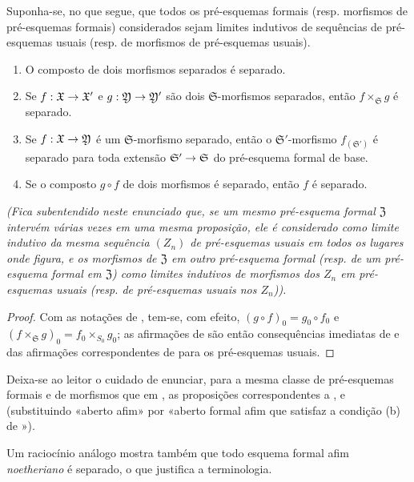 \documentclass[oneside]{amsart}
\makeatletter
\newcommand{\ega@arrow}[2]{\mathchoice{#1}{#2}{#2}{#2}}
\renewcommand{\to}{\ega@arrow{\longrightarrow}{\rightarrow}}
\newcommand{\oldpage}[2][]{{\marginnote{\normalfont\textbf{#1}~|~#2}}\ignorespaces}
\let\EGAOriginalLabel\label
\renewcommand{\label}[1]{\phantomsection\EGAOriginalLabel{#1}}
\makeatother
\begin{document}
\begin{proposition}[10.15.3]
\label{I.10.15.3}
Suponha-se, no que segue, que todos os pré-esquemas formais (resp. morfismos de pré-esquemas formais) considerados sejam limites indutivos de sequências de pré-esquemas usuais (resp. de morfismos de pré-esquemas usuais).
\begin{enumerate}
    \item[\rm{(i)}] O composto de dois morfismos separados é separado.
    \item[\rm{(ii)}] Se $f:\mathfrak{X}\to\mathfrak{X}'$ e $g:\mathfrak{Y}\to\mathfrak{Y}'$ são dois $\mathfrak{S}$-morfismos separados, então $f\times_\mathfrak{S}g$ é separado.
    \item[\rm{(iii)}] Se $f:\mathfrak{X}\to\mathfrak{Y}$ é um $\mathfrak{S}$-morfismo separado, então o $\mathfrak{S}'$-morfismo $f_{(\mathfrak{S}')}$ é separado para toda extensão $\mathfrak{S}'\to\mathfrak{S}$ do pré-esquema formal de base.
    \item[\rm{(iv)}] Se o composto $g\circ f$ de dois morfismos é separado, então $f$ é separado.
\end{enumerate}
\emph{(Fica subentendido neste enunciado que, se um mesmo pré-esquema formal $\mathfrak{Z}$ intervém várias vezes em uma mesma proposição, ele é considerado como limite indutivo da \emph{mesma} sequência $(Z_n)$ de pré-esquemas usuais em todos os lugares onde figura, e os morfismos de $\mathfrak{Z}$ em outro pré-esquema formal (resp. de um pré-esquema formal em $\mathfrak{Z}$) como limites indutivos de morfismos dos $Z_n$ em pré-esquemas usuais (resp. de pré-esquemas usuais nos $Z_n$)).}
\end{proposition}

\begin{proof}
Com as notações de , tem-se, com efeito, $(g\circ f)_0=g_0\circ f_0$ e $(f\times_\mathfrak{S}g)_0=f_0\times_{S_0}g_0$;
as afirmações de  são então consequências imediatas de  e das afirmações correspondentes de  para os pré-esquemas usuais.
\end{proof}

Deixa-se ao leitor o cuidado de enunciar, para a mesma classe de pré-esquemas formais e de morfismos que em , as proposições correspondentes a ,
\oldpage[I]{213}
 e  (substituindo «aberto afim» por «aberto formal afim que satisfaz a condição (b) de »).

Um raciocínio análogo mostra também que todo esquema formal afim \emph{noetheriano} é separado, o que justifica a terminologia.
\end{document}
